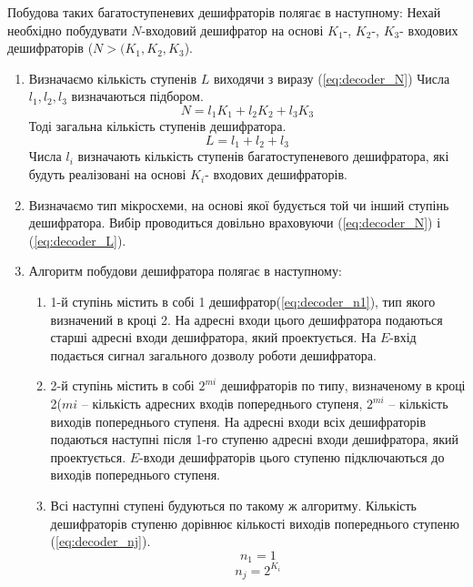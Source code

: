 Побудова  таких багатоступеневих дешифраторів полягає в наступному:
Нехай необхідно побудувати $N$-входовий дешифратор на основі  $K_{1}$-, $K_{2}$-, $K_{3}$- входових дешифраторів  ($N > (K_{1},K_{2},K_{3}$). 
\begin{enumerate}
\item Визначаємо кількість ступенів  $L$ виходячи з виразу (\ref{eq:decoder_N})
Числа $l_{1},l_{2},l_{3}$ визначаються підбором. 
\begin{equation}\label{eq:decoder_N}
N=l_{1}K_{1}+l_{2}K_{2}+l_{3}K_{3}
\end{equation}
Тоді загальна кількість ступенів дешифратора.
\begin{equation}\label{eq:decoder_L}
L=l_{1}+l_{2}+l_{3}
\end{equation}
Числа $l_{i}$ визначають кількість ступенів багатоступеневого дешифратора, які будуть реалізовані на основі $K_{i}$- входових дешифраторів.
\item  Визначаємо тип мікросхеми,  на основі якої будується той чи інший ступінь дешифратора. Вибір проводиться довільно враховуючи (\ref{eq:decoder_N})  і  (\ref{eq:decoder_L}).
\item Алгоритм побудови дешифратора полягає в наступному:
\begin{enumerate}
\item 1-й ступінь містить в собі 1 дешифратор(\ref{eq:decoder_n1}), тип якого визначений в кроці 2. На адресні входи цього дешифратора  подаються  старші адресні входи  дешифратора, який проектується. На $E$-вхід подається сигнал загального дозволу роботи дешифратора.
\item 2-й ступінь містить в собі  $2^{mi}$ дешифраторів по типу, визначеному в кроці 2($mi$ – кількість адресних входів попереднього ступеня, $2^{mi}$ – кількість виходів попереднього ступеня. На адресні входи всіх дешифраторів  подаються наступні після 1-го ступеню адресні входи  дешифратора, який проектується. $E$-входи дешифраторів цього ступеню підключаються до виходів попереднього ступеня.
\item Всі наступні ступені будуються по такому ж алгоритму. Кількість дешифраторів ступеню дорівнює кількості виходів попереднього ступеню (\ref{eq:decoder_nj}).
\begin{equation}\label{eq:decoder_n1}
n_{1}=1
\end{equation}
\begin{equation}\label{eq:decoder_nj}
n_{j}=2^{K_{i}}
\end{equation}
\end{enumerate}
\end{enumerate}
\newpage
